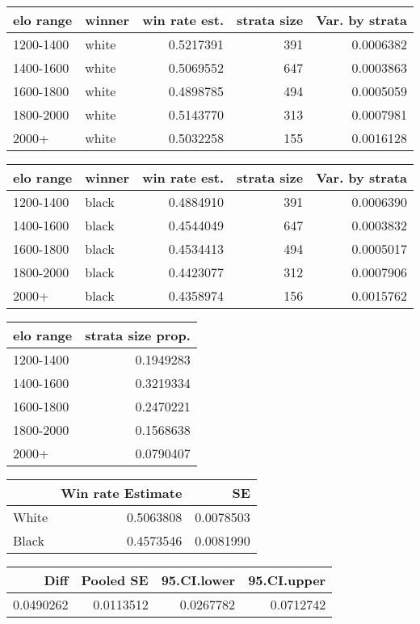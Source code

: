 \documentclass[11pt,]{article}
\begin{document}
\begin{table}[h] \centering  
\begin{tabular}{l|l|r|r|r}
\hline
elo range & winner & win rate est. & strata size & Var. by strata\\
\hline
1200-1400 & white & 0.5217391 & 391 & 0.0006382\\
\hline
1400-1600 & white & 0.5069552 & 647 & 0.0003863\\
\hline
1600-1800 & white & 0.4898785 & 494 & 0.0005059\\
\hline
1800-2000 & white & 0.5143770 & 313 & 0.0007981\\
\hline
2000+ & white & 0.5032258 & 155 & 0.0016128\\
\hline
\end{tabular} \hspace{1cm} \centering  
\begin{tabular}{l|l|r|r|r}
\hline
elo range & winner & win rate est. & strata size & Var. by strata\\
\hline
1200-1400 & black & 0.4884910 & 391 & 0.0006390\\
\hline
1400-1600 & black & 0.4544049 & 647 & 0.0003832\\
\hline
1600-1800 & black & 0.4534413 & 494 & 0.0005017\\
\hline
1800-2000 & black & 0.4423077 & 312 & 0.0007906\\
\hline
2000+ & black & 0.4358974 & 156 & 0.0015762\\
\hline
\end{tabular} \hspace{1cm} \centering  
\begin{tabular}{l|r}
\hline
elo range & strata size prop.\\
\hline
1200-1400 & 0.1949283\\
\hline
1400-1600 & 0.3219334\\
\hline
1600-1800 & 0.2470221\\
\hline
1800-2000 & 0.1568638\\
\hline
2000+ & 0.0790407\\
\hline
\end{tabular} \hspace{1cm} \centering  
\begin{tabular}{l|r|r}
\hline
  & Win rate Estimate & SE\\
\hline
White & 0.5063808 & 0.0078503\\
\hline
Black & 0.4573546 & 0.0081990\\
\hline
\end{tabular} \hspace{1cm} \centering  
\begin{tabular}{r|r|r|r}
\hline
Diff & Pooled SE & 95.CI.lower & 95.CI.upper\\
\hline
0.0490262 & 0.0113512 & 0.0267782 & 0.0712742\\
\hline
\end{tabular} \end{table}
\newpage
\end{document}
